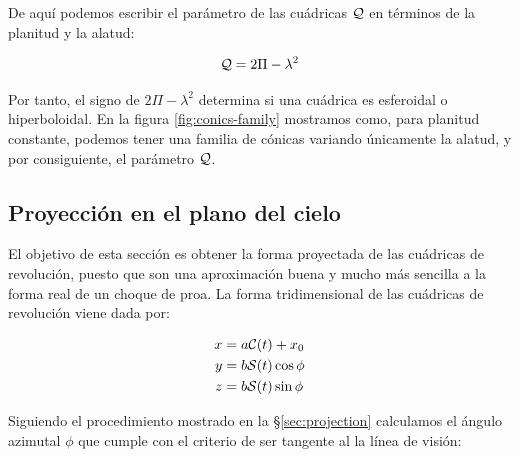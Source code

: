 De aquí podemos escribir el parámetro de las cuádricas $\mathcal{Q}$ en términos de la planitud y la alatud:

\begin{align}
  \mathcal{Q} = 2\Pi - \lambda^2 \label{eq:quadric-parameter-pi-lambda}
\end{align}

Por tanto, el signo de $2\Pi - \lambda^2$ determina si una cuádrica es esferoidal o hiperboloidal. En la figura \ref{fig:conics-family} mostramos como, para planitud constante, podemos tener una familia de cónicas variando únicamente la alatud, y por consiguiente, el parámetro $\mathcal{Q}$.
\subsection{Proyección en el plano del cielo}

El objetivo de esta sección es obtener la forma proyectada de las cuádricas de revolución, puesto que son una aproximación buena y mucho más sencilla a la forma real de un choque de proa. La forma tridimensional de las cuádricas de revolución viene dada por:

\begin{align}
  x &= a\mathcal{C}(t) + x_0 \\
  y &= b\mathcal{S}(t)\cos\phi \\
  z &= b\mathcal{S}(t)\sin\phi
\end{align}

Siguiendo el procedimiento mostrado en la \S \ref{sec:projection} calculamos el ángulo azimutal $\phi$ que cumple con el criterio de ser tangente al la línea de visión:

